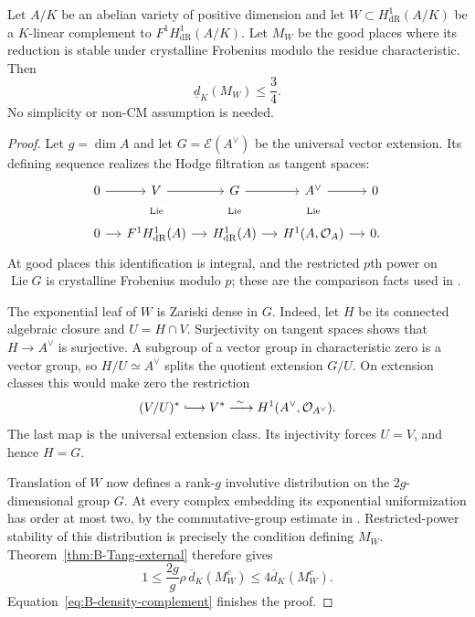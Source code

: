 \begin{theorem}
\label{thm:B-complement-general}\label{lem:complement-density-bound}
\label{lem:B-full-complement-dense}
Let $A/K$ be an abelian variety of positive dimension and let
$W\subset H^1_{\mathrm{dR}}(A/K)$ be a $K$-linear complement to
$F^1H^1_{\mathrm{dR}}(A/K)$.  Let $M_W$ be the good places where
its reduction is stable under crystalline Frobenius modulo the
residue characteristic.  Then
\begin{equation}\label{eq:B-complement-density}
                         \underline d_K(M_W)\le\frac34.
\end{equation}
No simplicity or non-CM assumption is needed.
\end{theorem}
\begin{proof}
Let $g=\dim A$ and let $G=\mathcal E(A^\vee)$ be the universal
vector extension.  Its defining sequence realizes the Hodge
filtration as tangent spaces:
\begin{equation}\label{eq:rev:universal-extension-diagram}
\begin{tikzcd}[column sep=small]
 0\arrow[r]&V\arrow[r]\arrow[d,phantom,"\scriptstyle\operatorname{Lie}" description]
 &G\arrow[r]\arrow[d,phantom,"\scriptstyle\operatorname{Lie}" description]
 &A^\vee\arrow[r]\arrow[d,phantom,"\scriptstyle\operatorname{Lie}" description]&0\\
 0\arrow[r]&F^1H^1_{\mathrm{dR}}(A)\arrow[r]
 &H^1_{\mathrm{dR}}(A)\arrow[r]&H^1(A,\mathcal O_A)\arrow[r]&0.
\end{tikzcd}
\end{equation}
At good places this identification is integral, and the restricted
$p$th power on $\operatorname{Lie}G$ is crystalline Frobenius
modulo $p$; these are the comparison facts used in
\cite[proof of Theorem 2.3.5 and Lemma 5.2.6]{Tang}.

The exponential leaf of $W$ is Zariski dense in $G$.  Indeed, let
$H$ be its connected algebraic closure and $U=H\cap V$.
Surjectivity on tangent spaces shows that $H\to A^\vee$ is
surjective.  A subgroup of a vector group in characteristic zero
is a vector group, so $H/U\simeq A^\vee$ splits the quotient
extension $G/U$.  On extension classes this would make zero the
restriction
\[
 (V/U)^*\lhook\joinrel\longrightarrow V^*
       \xrightarrow{\ \sim\ }H^1(A^\vee,\mathcal O_{A^\vee}).
\]
The last map is the universal extension class.  Its injectivity
forces $U=V$, and hence $H=G$.

Translation of $W$ now defines a rank-$g$ involutive distribution
on the $2g$-dimensional group $G$.  At every complex embedding
its exponential uniformization has order at most two, by the
commutative-group estimate in
\cite[proof of Proposition 2.3.4, footnote 20]{Tang}.
Restricted-power stability of this distribution is precisely the
condition defining $M_W$.  Theorem~\ref{thm:B-Tang-external}
therefore gives
\[
 1\le\frac{2g}{g}\rho\,\overline d_K(M_W^c)
                \le4\overline d_K(M_W^c).
\]
Equation~\eqref{eq:B-density-complement} finishes the proof.
\end{proof}

